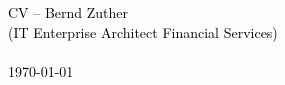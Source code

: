 \newcommand{\cccvname}{Bernd Zuther}
\newcommand{\cccvjobtitle}{IT Enterprise Architect Financial Services}

\NoBgThispage
\vspace*{18.5cm}
\noindent
\textcolor{black}{
{\Huge CV -- \cccvname}\\[8pt]
{\huge (\cccvjobtitle)}\\
\\[8pt]
{\today}
}

